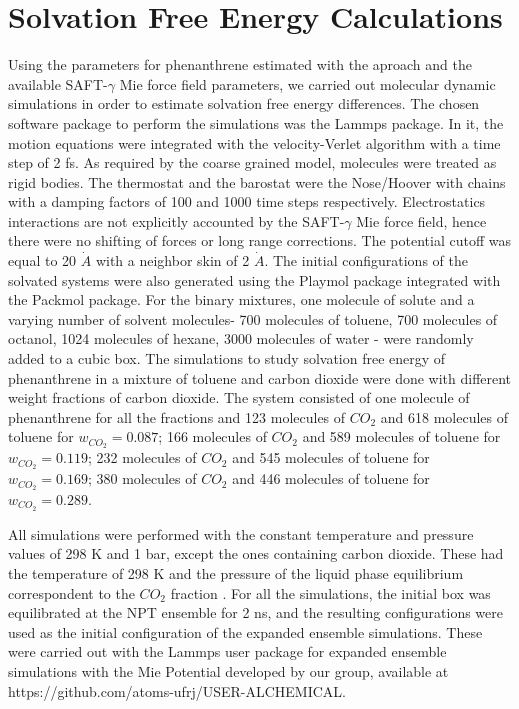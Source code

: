 \section{Solvation Free Energy Calculations}\label{solvme}

Using the parameters for phenanthrene estimated with the  aproach  and the available SAFT-$\gamma$ Mie force field parameters, we carried out molecular dynamic simulations in order to estimate solvation free energy differences. The chosen software package to perform the simulations was the Lammps package\cite{lammps}. In it, the motion equations were integrated with the velocity-Verlet algorithm \cite{verlet} with a time step of 2 fs. As required by the coarse grained model,  molecules were treated as rigid bodies. The thermostat and the barostat were the Nose/Hoover with chains with a damping factors of 100 and 1000 time steps respectively. Electrostatics interactions are not explicitly accounted by the SAFT-$\gamma$ Mie force field, hence there were no shifting of forces or long range corrections. The potential cutoff was equal to 20 $\dot{A}$ \cite{muller2017} with a neighbor skin of 2 $\dot{A}$. The initial configurations of the  solvated systems were also generated using the Playmol package integrated with the Packmol package. For the binary mixtures, one molecule of solute and a varying number of solvent molecules- 700 molecules of toluene, 700 molecules of octanol, 1024 molecules of hexane, 3000 molecules of water - were randomly added to a cubic box. The simulations to study solvation free energy of phenanthrene in a mixture of toluene and carbon dioxide were done with different weight fractions of carbon dioxide. The  system consisted of one molecule of phenanthrene for all the fractions and 123 molecules of $CO_{2}$ and 618 molecules of toluene for $w_{CO_{2}} = 0.087$; 166 molecules of $CO_{2}$ and 589 molecules of toluene for $w_{CO_{2}} = 0.119$; 232 molecules of $CO_{2}$ and 545 molecules of toluene for $w_{CO_{2}} = 0.169$; 380 molecules of $CO_{2}$ and 446 molecules of toluene for $w_{CO_{2}} = 0.289$.

All simulations were performed with the constant temperature and pressure values of 298 K and 1 bar, except the ones containing carbon dioxide. These had the temperature of 298 K and the pressure of the liquid phase equilibrium correspondent to the $CO_{2}$ fraction \cite{co2toliq}. For all the simulations, the initial box was equilibrated at the NPT ensemble for 2 ns, and the resulting configurations were used as the initial configuration of the expanded ensemble simulations. These were carried out with the Lammps user package for expanded ensemble simulations with the Mie Potential developed by our group, available at https://github.com/atoms-ufrj/USER-ALCHEMICAL. 

